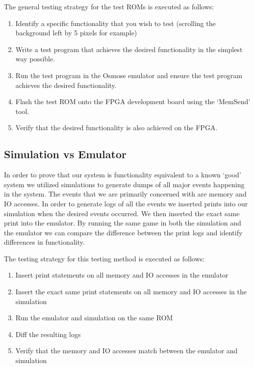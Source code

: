 \documentclass{article}
\begin{document}
The general testing strategy for the test ROMs is executed as follows:

\begin{enumerate}
    \item Identify a specific functionality that you wish to test (scrolling the background left by 5 pixels for example)
    \item Write a test program that achieves the desired functionality in the simplest way possible.
    \item Run the test program in the Osmose emulator and ensure the test program achieves the desired functionality.
    \item Flash the test ROM onto the FPGA development board using the `MemSend' tool.
    \item Verify that the desired functionality is also achieved on the FPGA.
\end{enumerate}

\subsection{Simulation vs Emulator}

In order to prove that our system is functionality equivalent to a known `good'
system we utilized simulations to generate dumps of all major events happening
in the system. The events that we are primarily concerned with are memory and
IO accesses. In order to generate logs of all the events we inserted prints
into our simulation when the desired events occurred. We then inserted the
exact same print into the emulator. By running the same game in both the
simulation and the emulator we can compare the difference between the print
logs and identify differences in functionality.

The testing strategy for this testing method is executed as follows:

\begin{enumerate}
    \item Insert print statements on all memory and IO accesses in the emulator
    \item Insert the exact same print statements on all memory and IO accesses in the simulation
    \item Run the emulator and simulation on the same ROM
    \item Diff the resulting logs
    \item Verify that the memory and IO accesses match between the emulator and simulation
\end{enumerate}
\end{document}
